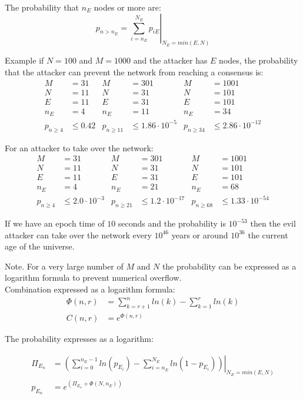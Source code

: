 The probability that $n_E$ nodes or more are:
\begin{equation}
 p_{n>n_E} = \left. \sum_{i=n_E}^{N_E}{p_{iE} } \right|_{N_E = min(E,N)}
\end{equation}


Example if $N=100$ and $M=1000$ and the attacker has $E$ nodes, the probability that the attacker can prevent the network from reaching a consensus is:
\begin{align*}
 M &= 31 & M &= 301 & M &= 1001 \\
 N &= 11 & N &= 31 & N &= 101 \\
 E &= 11 & E &= 31 & E &= 101 \\
 n_E &= 4 & n_E &= 11 & n_E &= 34 \\
 p_{n \ge 4} &\leq 0.42 & 
 p_{n \ge 11} &\leq 1.86 \cdot 10^{-5} & 
 p_{n \ge 34} &\leq 2.86 \cdot 10^{-12}
	\end{align*}

For an attacker to take over the network:
\begin{align*}
 M &= 31 & M &= 301 & M &= 1001 \\
 N &= 11 & N &= 31 & N &= 101 \\
 E &= 11 & E &= 31 & E &= 101 \\
 n_E &= 4 & n_E &= 21 & n_E &= 68 \\
 p_{n \ge 4 } &\leq 2.0 \cdot 10^{-3} & 
 p_{n \ge 21} &\leq 1.2 \cdot 10^{-17} & 
 p_{n \ge 68} &\leq 1.33 \cdot 10^{-54}
\end{align*}


If we have an epoch time of $10$ seconds and the probability is $10^{-53}$ then the evil attacker can take over the network every $10^{46}$ years or around $10^{36}$ the current age of the universe.

Note.
For a very large number of $M$ and $N$ the probability can be expressed as a logarithm formula to prevent numerical overflow.\\
Combination expressed as a logarithm formula:
\begin{align*}
 \Phi (n,r) &= \sum_{k=r+1}^{n}{ln(k)} - \sum_{k=1}^{r}{ln(k)} \\
 C(n,r) &= e^{{\Phi}(n,r)}
\end{align*}


The probability expresses as a logarithm:

\begin{align*}
{\Pi}_{E_n} &= \left. \left( \sum_{i=0}^{n_E-1}{ln(p_{E_i})} - \sum_{i=n_E}^{N_E}{ln(1-p_{E_i})} \right) 
\right|_{N_E = min(E,N)} \\
p_{E_n} &= e^{({\Pi}_{E_n}+\Phi(N,n_E))}
\end{align*}


